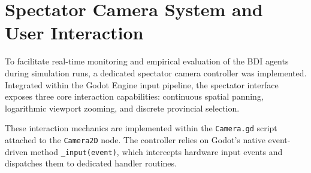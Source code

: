 \section{Spectator Camera System and User Interaction}
\label{sec:camera_controls}

To facilitate real-time monitoring and empirical evaluation of the BDI agents during simulation runs, a dedicated spectator camera controller was implemented. Integrated within the Godot Engine input pipeline, the spectator interface exposes three core interaction capabilities: continuous spatial panning, logarithmic viewport zooming, and discrete provincial selection.

These interaction mechanics are implemented within the \texttt{Camera.gd} script attached to the \texttt{Camera2D} node. The controller relies on Godot's native event-driven method \texttt{\_input(event)}, which intercepts hardware input events and dispatches them to dedicated handler routines.

